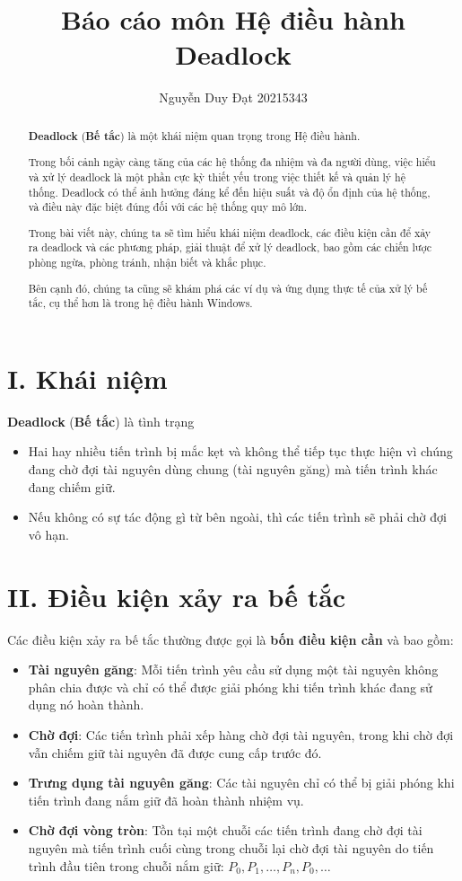 \documentclass[12pt]{report}
\title{\textbf{Báo cáo môn Hệ điều hành} \\ \textbf{Deadlock}}
\author{Nguyễn Duy Đạt 20215343}
\date{}
\begin{document}
\maketitle
\begin{abstract}
	\textbf{Deadlock} (\textbf{Bế tắc}) là một khái niệm quan trọng trong Hệ điều hành. \vspace{2mm}
	
	Trong bối cảnh ngày càng tăng của các hệ thống đa nhiệm và đa người dùng, việc hiểu và xử lý deadlock là một phần cực kỳ thiết yếu trong việc thiết kế và quản lý hệ thống. Deadlock có thể ảnh hưởng đáng kể đến hiệu suất và độ ổn định của hệ thống, và điều này đặc biệt đúng đối với các hệ thống quy mô lớn.
	\vspace{2mm} 
	
	Trong bài viết này, chúng ta sẽ tìm hiểu khái niệm deadlock, các điều kiện cần để xảy ra deadlock và các phương pháp, giải thuật để xử lý deadlock, bao gồm các chiến lược phòng ngừa, phòng tránh, nhận biết và khắc phục.
	\vspace{2mm}
	
	Bên cạnh đó, chúng ta cũng sẽ khám phá các ví dụ và ứng dụng thực tế của xử lý bế tắc, cụ thể hơn là trong hệ điều hành Windows.
\end{abstract}
\section*{I. Khái niệm}
\textbf{Deadlock} (\textbf{Bế tắc}) là tình trạng 
\begin{itemize}
	\item Hai hay nhiều tiến trình bị mắc kẹt và không thể tiếp tục thực hiện vì chúng đang chờ đợi tài nguyên dùng chung (tài nguyên găng) mà tiến trình khác đang chiếm giữ.
	\item Nếu không có sự tác động gì từ bên ngoài, thì các tiến trình sẽ phải chờ đợi vô hạn.
\end{itemize}
\section*{II. Điều kiện xảy ra bế tắc}
Các điều kiện xảy ra bế tắc thường được gọi là \textbf{bốn điều kiện cần} và bao gồm:

\begin{itemize}
	\item \textbf{Tài nguyên găng}: Mỗi tiến trình yêu cầu sử dụng một tài nguyên không phân chia được và chỉ có thể được giải phóng khi tiến trình khác đang sử dụng nó hoàn thành.
	\item \textbf{Chờ đợi}: Các tiến trình phải xếp hàng chờ đợi tài nguyên, trong khi chờ đợi vẫn chiếm giữ tài nguyên đã được cung cấp trước đó.
	\item \textbf{Trưng dụng tài nguyên găng}: Các tài nguyên chỉ có thể bị giải phóng khi tiến trình đang nắm giữ đã hoàn thành nhiệm vụ.
	\item \textbf{Chờ đợi vòng tròn}: Tồn tại một chuỗi các tiến trình đang chờ đợi tài nguyên mà tiến trình cuối cùng trong chuỗi lại chờ đợi tài nguyên do tiến trình đầu tiên trong chuỗi nắm giữ: ${P_0,P_1,\ldots,P_n,P_0,\ldots}$
\end{itemize}
\end{document}
